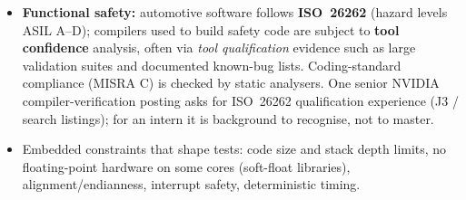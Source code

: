 \documentclass[10pt,a4paper,openany,oneside]{report}
\begin{document}
\begin{itemize}[nosep]
\item \textbf{Functional safety:} automotive software follows \textbf{ISO~26262} (hazard levels ASIL A--D); compilers used to build safety code are subject to \textbf{tool confidence} analysis, often via \emph{tool qualification} evidence such as large validation suites and documented known-bug lists. Coding-standard compliance (MISRA C) is checked by static analysers. One senior NVIDIA compiler-verification posting asks for ISO~26262 qualification experience (J3 / search listings); for an intern it is background to recognise, not to master.
\item Embedded constraints that shape tests: code size and stack depth limits, no floating-point hardware on some cores (soft-float libraries), alignment/endianness, interrupt safety, deterministic timing.
\end{itemize}
\end{document}

